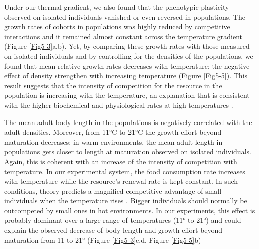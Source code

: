 Under our thermal gradient, we also found that the phenotypic plasticity
observed on isolated individuals vanished or even reversed in populations. The
growth rates of cohorts in populations was highly reduced by competitive
interactions and it remained almost constant across the temperature gradient
(Figure \ref{Fig5-3}a,b). Yet, by comparing these growth rates with those measured on
isolated individuals and by controlling for the densities of the populations, we
found that mean relative growth rates decreases with temperature: the negative
effect of density strengthen with increasing temperature (Figure \ref{Fig5-5}).
This result suggests that the intensity of competition for the resource in the population is
increasing with the temperature, an explanation that is consistent with the
higher biochemical and physiological rates at high
temperatures \autocite{gillooly2002a}.

The mean adult body length in the populations is negatively correlated with the
adult densities. Moreover, from 11°C to 21°C the growth effort beyond maturation
decreases: in warm environments, the mean adult length in populations gets
closer to length at maturation observed on isolated individuals. Again, this is
coherent with an increase of the intensity of competition with temperature. In
our experimental system, the food consumption rate increases with temperature
while the resource's renewal rate is kept constant. In such conditions, theory
predicts a magnified competitive advantage of small individuals when the
temperature rises \autocite{ohlberger2011a}. Bigger individuals
should normally be outcompeted by small ones in hot environments. In our experiments, this effect
is probably dominant over a large range of temperatures (11° to 21°) and could
explain the observed decrease of body length and growth effort beyond maturation
from 11 to 21° (Figure \ref{Fig5-3}c,d, Figure \ref{Fig5-5}b)

